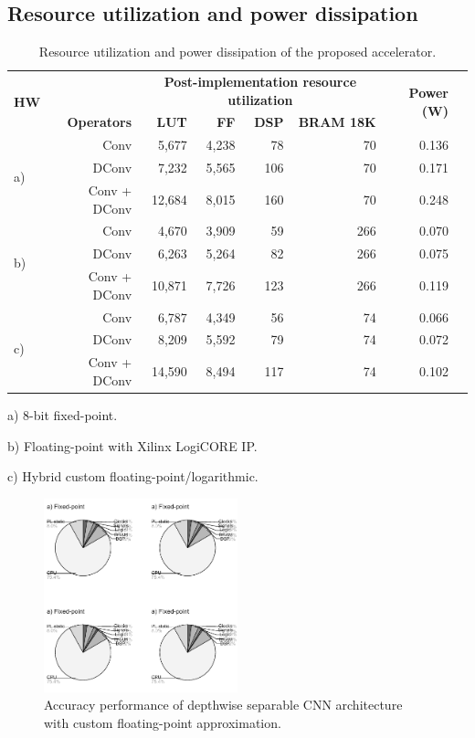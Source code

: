 \subsection{Resource utilization and power dissipation}
\begin{table}[!htp]\centering
	\caption{Resource utilization and power dissipation of the proposed accelerator.}\label{tab: }
	\scriptsize
	\begin{tabular}{lrrrrrrr}\toprule
		\multirow{2}{*}{\textbf{HW}} &\textbf{} &\multicolumn{4}{c}{\textbf{Post-implementation resource utilization}} &\multirow{2}{*}{\textbf{Power (W)}} \\\cmidrule{3-6}
		&\textbf{Operators} &\textbf{LUT} &\textbf{FF} &\textbf{DSP} &\textbf{BRAM 18K} & \\\midrule
		\multirow{3}{*}{a)} &Conv &5,677 &4,238 &78 &70 &0.136 \\
		&DConv &7,232 &5,565 &106 &70 &0.171 \\
		&Conv + DConv &12,684 &8,015 &160 &70 &0.248 \\
		\multirow{3}{*}{b)} &Conv &4,670 &3,909 &59 &266 &0.070 \\
		&DConv &6,263 &5,264 &82 &266 &0.075 \\
		&Conv + DConv &10,871 &7,726 &123 &266 &0.119 \\
		\multirow{3}{*}{c)} &Conv &6,787 &4,349 &56 &74 &0.066 \\
		&DConv &8,209 &5,592 &79 &74 &0.072 \\
		&Conv + DConv &14,590 &8,494 &117 &74 &0.102 \\
		\bottomrule
	\end{tabular}
	\begin{tablenotes}
		\item a) 8-bit fixed-point.
		\item b) Floating-point with Xilinx LogiCORE IP.
		\item c) Hybrid custom floating-point/logarithmic.
	\end{tablenotes}
\end{table}

\begin{figure}[t!]
	\centering
	\includegraphics[width=0.5\textwidth]{../figures/power_breackdown.pdf}
	\caption{Accuracy performance of depthwise separable CNN architecture with custom floating-point approximation.}
	\label{fig:acc_custom}
\end{figure}